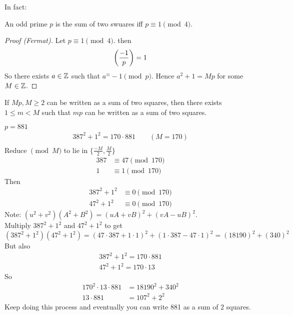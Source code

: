     In fact: 
    \begin{theorem}
        An odd prime $p$ is the sum of two swuares iff 
        $p\equiv 1\pmod{4}$.
        \begin{proof} [Proof (Fermat)]
            Let $p\equiv 1\pmod{4}$. then
            \[
                \left( \frac{-1}{p} \right)  = 1
            \]
            So there exists $a\in\mathbb{Z}$ such that $a^\equiv -1\pmod{p}$. 
            Hence $a^2+1=Mp$ for some $M\in\mathbb{Z}$. 
        \end{proof}
        \begin{lemma} [Fermat]
            If $Mp, M\ge 2$ can be written as a sum of two squares,
            then there exists $1\le m< M$ such that $mp$ can be written as a sum of two squares.
            \begin{example}
                $p=881$
                \begin{align*}
                    387^2 + 1^2 = 170\cdot 881 \qquad (M=170) \\
                \end{align*}
                Reduce $\pmod{M}$ to lie in $\{\frac{-M}{2}, \frac{M}{2}\}$
                \begin{align*}
                    387 &\equiv 47\pmod{170} \\
                    1 &\equiv 1\pmod{170}
                \end{align*}
                Then 
                \begin{align*}
                    387^2 + 1^2 &\equiv 0 \pmod{170} \\
                    47^2 + 1^2  &\equiv 0 \pmod{170}
                \end{align*}
                Note: $(u^2+v^2)(A^2+B^2) = (uA+vB)^2+(vA-uB)^2$. \\
                Multiply $387^2 + 1^2$ and $47^2 + 1^2$ to get 
                \[
                    (387^2 + 1^2)(47^2 + 1^2) = (47\cdot 387 + 1\cdot 1)^2 + (1\cdot 387 - 47\cdot 1)^2 
                    = (18190)^2 + (340)^2
                \]
                But also 
                \begin{align*}
                    387^2 + 1^2 = 170\cdot 881 \\
                    47^2 + 1^2 = 170\cdot 13
                \end{align*}
                So 
                \begin{align*}
                    170^2\cdot 13\cdot 881 &= 18190^2 + 340^2 \\
                    13\cdot 881 &= 107^2 + 2^2
                \end{align*}
                Keep doing this process and eventually you can write 881 as a sum of 2 squares.
            \end{example}
        \end{lemma}
    \end{theorem}